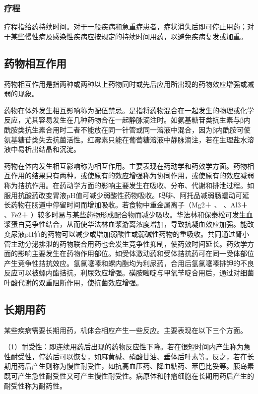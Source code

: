 \subsubsection{疗程}

疗程指给药持续时间。对于一般疾病和急重症患者，症状消失后即可停止用药；对于某些慢性病及感染性疾病应按规定的持续时间用药，以避免疾病复发或加重。

\subsection{药物相互作用}

药物相互作用是指两种或两种以上药物同时或先后应用所出现的药物效应增强或减弱的现象。

药物在体外发生相互影响称为配伍禁忌。是指将药物混合在一起发生的物理或化学反应，尤其容易发生在几种药物合在一起静脉滴注时。如氨基糖苷类抗生素与β内酰胺类抗生素合用时二者不能放在同一针管或同一溶液中混合，因为β内酰胺可使氨基糖苷类失去抗菌活性。红霉素只能在葡萄糖溶液中静脉滴注，若在生理盐水溶液中易析出结晶和沉淀。

药物在体内发生相互影响称为相互作用。主要表现在药动学和药效学方面。药物相互作用的结果只有两种，或使原有的效应增强称为协同作用，或使原有的效应减弱称为拮抗作用。在药动学方面的影响主要发生在吸收、分布、代谢和排泄过程。如服用抗酸药改变胃液pH值可减少弱酸性药物吸收。吗啡、阿托品减弱肠蠕动可延长药物在肠道中停留时间而增加吸收。若食物中重金属离子（Mg{2＋}
、 、Al{3＋} 、Fe{2＋}
）较多时易与某些药物形成配合物而减少吸收。华法林和保泰松可发生血浆蛋白竞争性结合，从而使华法林血浆游离浓度增加，导致抗凝血效应加强。能改变尿液pH值的药物可以减少或增加弱酸性或弱碱性药物的重吸收。共同通过肾小管主动分泌排泄的药物联合用药也会发生竞争性抑制，使药效时间延长。药效学方面的影响主要发生在药物作用部位。如受体激动药和受体拮抗药可在同一受体部位产生竞争性拮抗效应。氢氯噻嗪和螺内酯均为利尿药，合用后氢氯噻嗪排钾的不良反应可以被螺内酯拮抗，利尿效应增强。磺胺嘧啶与甲氧苄啶合用后，通过对细菌叶酸代谢的双重阻断作用，使抗菌效应增强。

\subsection{长期用药}

某些疾病需要长期用药，机体会相应产生一些反应。主要表现在以下三个方面。

（1）耐受性：即连续用药后出现的药物反应性下降。若在很短时间内产生称为急性耐受性，停药后可以恢复，如麻黄碱、硝酸甘油、垂体后叶素等。反之，若在长期用药后产生则称为慢性耐受性，如抗高血压药、降血糖药、苯巴比妥等。胰岛素既可产生急性耐受性又可产生慢性耐受性。病原体和肿瘤细胞在长期用药后产生的耐受性称为耐药性。

